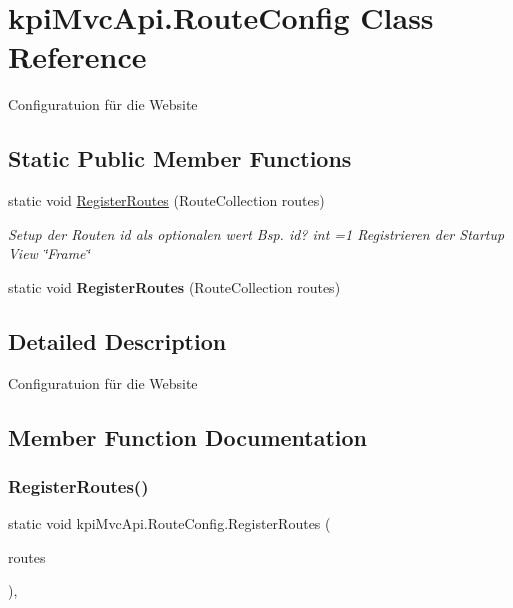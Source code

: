 \hypertarget{classkpi_mvc_api_1_1_route_config}{}\section{kpi\+Mvc\+Api.\+Route\+Config Class Reference}
\label{classkpi_mvc_api_1_1_route_config}


Configuratuion für die Website  


\subsection*{Static Public Member Functions}
\begin{DoxyCompactItemize}
\item 
static void \hyperlink{classkpi_mvc_api_1_1_route_config_a7695727c1d42e9d813eb3c0c63802ec3}{Register\+Routes} (Route\+Collection routes)
\begin{DoxyCompactList}\small\item\em Setup der Routen id als optionalen wert Bsp. id? int =1 Registrieren der Startup View \char`\"{}\+Frame\char`\"{} \end{DoxyCompactList}\item 
\mbox{\label{classkpi_mvc_api_1_1_route_config_a7695727c1d42e9d813eb3c0c63802ec3}} 
static void {\bfseries Register\+Routes} (Route\+Collection routes)
\end{DoxyCompactItemize}


\subsection{Detailed Description}
Configuratuion für die Website 



\subsection{Member Function Documentation}
\mbox{\label{classkpi_mvc_api_1_1_route_config_a7695727c1d42e9d813eb3c0c63802ec3}} 
\subsubsection{\texorpdfstring{Register\+Routes()}{RegisterRoutes()}}
{\footnotesize\ttfamily static void kpi\+Mvc\+Api.\+Route\+Config.\+Register\+Routes (\begin{DoxyParamCaption}\item[{Route\+Collection}]{routes }\end{DoxyParamCaption})\hspace{0.3cm}{\ttfamily [inline]}, {\ttfamily [static]}}



